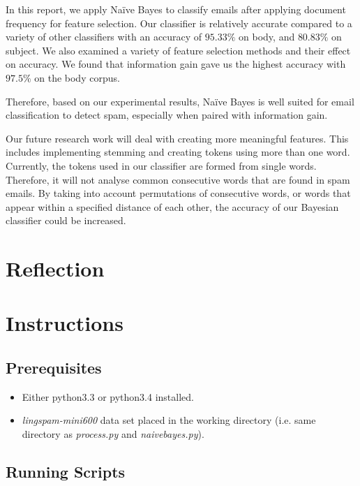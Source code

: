 \documentclass[10pt, a4paper]{article}
\begin{document}

In this report, we apply Na\"ive Bayes to classify emails after applying document frequency for feature selection. Our classifier is relatively accurate compared to a variety of other classifiers with an accuracy of $95.33\%$ on body, and $80.83\%$ on subject. We also examined a variety of feature selection methods and their effect on accuracy. We found that information gain gave us the highest accuracy with $97.5\%$ on the body corpus.

Therefore, based on our experimental results, Na\"ive Bayes is well suited for email classification to detect spam, especially when paired with information gain. 

Our future research work will deal with creating more meaningful features. This includes implementing stemming and creating tokens using more than one word. Currently, the tokens used in our classifier are formed from single words. Therefore, it will not analyse common consecutive words that are found in spam emails. By taking into account permutations of consecutive words, or words that appear within a specified distance of each other, the accuracy of our Bayesian classifier could be increased.

\section{Reflection}

\section{Instructions}

\subsection{Prerequisites}

\begin{itemize}
\item Either python3.3 or python3.4 installed.
\item \textit{lingspam-mini600} data set placed in the working directory (i.e. same directory as \textit{process.py} and \textit{naivebayes.py}).
\end{itemize}

\subsection{Running Scripts}
\end{document}

